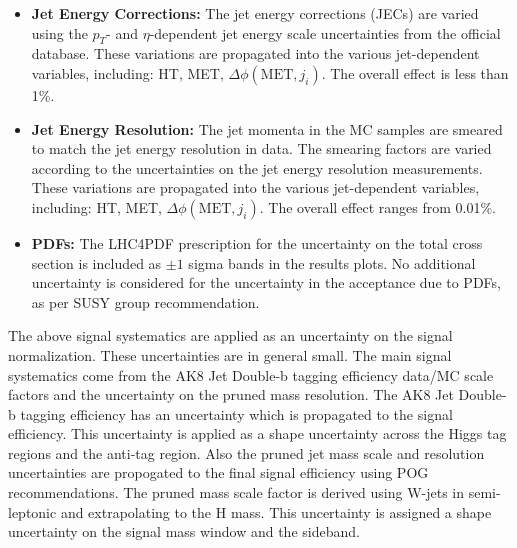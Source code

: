 \begin{itemize}
\item {\bf Jet Energy Corrections:} The jet energy corrections (JECs) are varied using the $p_{T}$-
and $\eta$-dependent jet energy scale uncertainties from the official database.
These variations are propagated into the various jet-dependent variables, including: HT, MET, $\Delta\phi(\textrm{MET},j_{i})$.
The overall effect is less than 1\%.
\item {\bf Jet Energy Resolution:} The jet momenta in the MC samples are smeared to match the jet energy resolution in data. The smearing factors are varied according to the uncertainties on the jet energy resolution measurements.
These variations are propagated into the various jet-dependent variables, including: HT, MET, $\Delta\phi(\textrm{MET},j_{i})$.
The overall effect ranges from 0.01\%.
\item {\bf PDFs:} The LHC4PDF prescription for the uncertainty on the total cross section is included as $\pm 1$ sigma bands in the results plots. No
additional uncertainty is considered for the uncertainty in the acceptance due to PDFs, as per SUSY group recommendation.
\end{itemize}
The above signal systematics are applied as an uncertainty on the signal normalization. These uncertainties are in general small. The main signal systematics 
come from the AK8 Jet Double-b tagging efficiency data/MC scale factors and the uncertainty on the pruned mass resolution.
The AK8 Jet Double-b tagging efficiency has an uncertainty which is propagated to the signal efficiency. This uncertainty is applied 
as a shape uncertainty across the Higgs tag regions and the anti-tag region. Also the pruned jet mass scale and resolution uncertainties are 
propogated to the final signal efficiency using POG recommendations. The pruned mass scale factor is derived using W-jets in semi-leptonic \ttbar and extrapolating to the H mass. This uncertainty is assigned a shape uncertainty on the signal mass window and the sideband. \\
